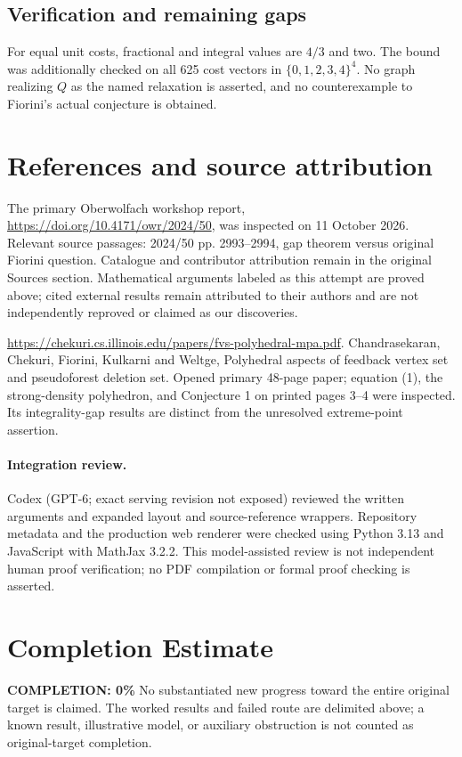 \documentclass[11pt]{article}
\begin{document}
\subsection{Verification and remaining gaps}
For equal unit costs, fractional and integral values are $4/3$ and two. The bound was additionally checked on all 625 cost vectors in $\{0,1,2,3,4\}^4$. No graph realizing $Q$ as the named relaxation is asserted, and no counterexample to Fiorini's actual conjecture is obtained.

\section{References and source attribution}
The primary Oberwolfach workshop report, \url{https://doi.org/10.4171/owr/2024/50}, was inspected on 11 October 2026. Relevant source passages: 2024/50 pp. 2993--2994, gap theorem versus original Fiorini question. Catalogue and contributor attribution remain in the original Sources section. Mathematical arguments labeled as this attempt are proved above; cited external results remain attributed to their authors and are not independently reproved or claimed as our discoveries.

\url{https://chekuri.cs.illinois.edu/papers/fvs-polyhedral-mpa.pdf}. Chandrasekaran, Chekuri, Fiorini, Kulkarni and Weltge, Polyhedral aspects of feedback vertex set and pseudoforest deletion set. Opened primary 48-page paper; equation (1), the strong-density polyhedron, and Conjecture 1 on printed pages 3--4 were inspected. Its integrality-gap results are distinct from the unresolved extreme-point assertion.


\paragraph{Integration review.} Codex (GPT-6; exact serving revision not exposed) reviewed the written arguments and expanded layout and source-reference wrappers. Repository metadata and the production web renderer were checked using Python 3.13 and JavaScript with MathJax 3.2.2. This model-assisted review is not independent human proof verification; no PDF compilation or formal proof checking is asserted.

\section{Completion Estimate}
\noindent\textbf{COMPLETION: 0\%}
No substantiated new progress toward the entire original target is claimed. The worked results and failed route are delimited above; a known result, illustrative model, or auxiliary obstruction is not counted as original-target completion.
\end{document}
